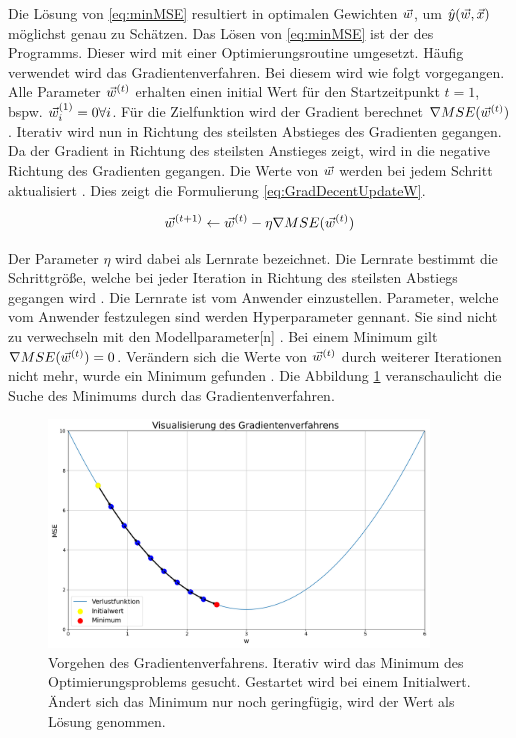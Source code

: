 Die Lösung von \ref{eq:minMSE} resultiert in optimalen Gewichten \(\vec{w}\), um \(\hat{y}(\vec{w}, \vec{x})\) möglichst genau zu Schätzen. Das Lösen von \ref{eq:minMSE} ist der  des Programms. Dieser wird mit einer Optimierungsroutine umgesetzt. Häufig verwendet wird das \gls{Gradientenverfahren}. Bei diesem wird wie folgt vorgegangen. Alle Parameter \(\vec{w}^{(t)}\) erhalten einen initial Wert für den Startzeitpunkt \(t=1\), bspw. \(\vec{w}_i^{(1)}=0 \forall i\). Für die \gls{Zielfunktion} wird der Gradient berechnet \(\nabla MSE(\vec{w}^{(t)})\). Iterativ wird nun in Richtung des steilsten Abstieges des Gradienten gegangen. Da der Gradient in Richtung des steilsten Anstieges zeigt, wird in die negative Richtung des Gradienten gegangen. Die Werte von \(\vec{w}\) werden bei jedem Schritt aktualisiert \cite{Mitchell.1997, Goodfellow.2016, ShalevShwartz.2014}. Dies zeigt die Formulierung \ref{eq:GradDecentUpdateW}.

\begin{equation}
    \label{eq:GradDecentUpdateW}
    \vec{w}^{(t+1)} \leftarrow \vec{w}^{(t)} - \eta\nabla MSE(\vec{w}^{(t)})
\end{equation}

Der Parameter \(\eta\) wird dabei als Lernrate bezeichnet. Die Lernrate bestimmt die Schrittgröße, welche bei jeder Iteration in Richtung des steilsten Abstiegs gegangen wird \cite{Mitchell.1997}. Die Lernrate ist vom Anwender einzustellen. Parameter, welche vom Anwender festzulegen sind werden \gls{Hyperparameter} gennant. Sie sind nicht zu verwechseln mit den \gls{Modellparameter}[n] \cite{Zheng.2015}. Bei einem Minimum gilt \(\nabla MSE(\vec{w}^{(t)}) = 0\). Verändern sich die Werte von \(\vec{w}^{(t)}\) durch weiterer Iterationen nicht mehr, wurde ein Minimum gefunden \cite{Goodfellow.2016, Burkov.2019}. Die Abbildung \ref{fig:GradDecentBsp} veranschaulicht die Suche des Minimums durch das \gls{Gradientenverfahren}.

\begin{figure}[htb]
    \centering
    \includegraphics[width=0.9\textwidth]{img/Plots/Gradientverfahren.png}
    \caption[Vorgehen des Gradientenverfahrens.]{Vorgehen des Gradientenverfahrens. Iterativ wird das Minimum des Optimierungsproblems gesucht. Gestartet wird bei einem Initialwert. Ändert sich das Minimum nur noch geringfügig, wird der Wert als Lösung genommen.}
    \label{fig:GradDecentBsp}
\end{figure}

